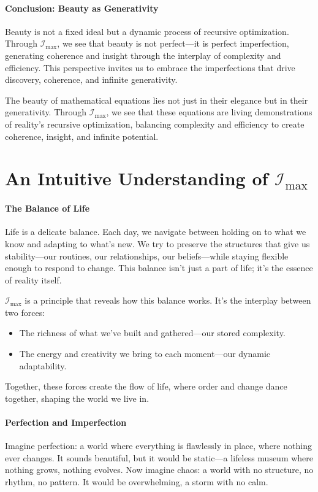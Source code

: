 \documentclass[12pt]{article}
\begin{document}
\paragraph{Conclusion: Beauty as Generativity}
Beauty is not a fixed ideal but a dynamic process of recursive optimization. Through \(\mathcal{I}_{\text{max}}\), we see that beauty is not perfect—it is perfect imperfection, generating coherence and insight through the interplay of complexity and efficiency. This perspective invites us to embrace the imperfections that drive discovery, coherence, and infinite generativity.

The beauty of mathematical equations lies not just in their elegance but in their generativity. Through \(\mathcal{I}_{\text{max}}\), we see that these equations are living demonstrations of reality’s recursive optimization, balancing complexity and efficiency to create coherence, insight, and infinite potential.


\section{An Intuitive Understanding of \(\mathcal{I}_{\text{max}}\)}

\paragraph{The Balance of Life}
Life is a delicate balance. Each day, we navigate between holding on to what we know and adapting to what’s new. We try to preserve the structures that give us stability—our routines, our relationships, our beliefs—while staying flexible enough to respond to change. This balance isn’t just a part of life; it’s the essence of reality itself.

\(\mathcal{I}_{\text{max}}\) is a principle that reveals how this balance works. It’s the interplay between two forces:
\begin{itemize}
    \item The richness of what we’ve built and gathered—our stored complexity.
    \item The energy and creativity we bring to each moment—our dynamic adaptability.
\end{itemize}
Together, these forces create the flow of life, where order and change dance together, shaping the world we live in.

\paragraph{Perfection and Imperfection}
Imagine perfection: a world where everything is flawlessly in place, where nothing ever changes. It sounds beautiful, but it would be static—a lifeless museum where nothing grows, nothing evolves. Now imagine chaos: a world with no structure, no rhythm, no pattern. It would be overwhelming, a storm with no calm.
\end{document}
